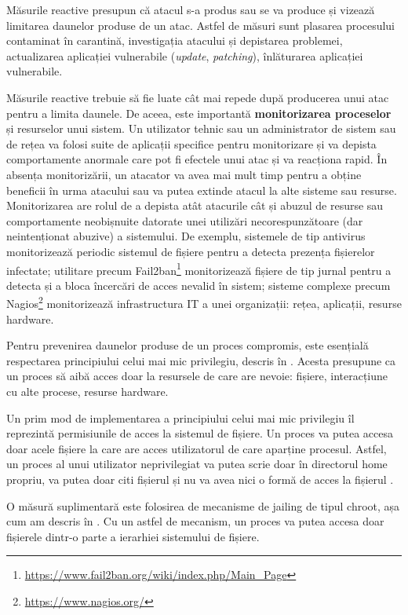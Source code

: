 Măsurile reactive presupun că atacul s-a produs sau se va produce și vizează limitarea daunelor produse de un atac. Astfel de măsuri sunt plasarea procesului contaminat în carantină, investigația atacului și depistarea problemei, actualizarea aplicației vulnerabile (\textit{update}, \textit{patching}), înlăturarea aplicației vulnerabile.

Măsurile reactive trebuie să fie luate cât mai repede după producerea unui atac pentru a limita daunele. De aceea, este importantă \textbf{monitorizarea proceselor} și resurselor unui sistem. Un utilizator tehnic sau un administrator de sistem sau de rețea va folosi suite de aplicații specifice pentru monitorizare și va depista comportamente anormale care pot fi efectele unui atac și va reacționa rapid. În absența monitorizării, un atacator va avea mai mult timp pentru a obține beneficii în urma atacului sau va putea extinde atacul la alte sisteme sau resurse. Monitorizarea are rolul de a depista atât atacurile cât și abuzul de resurse sau comportamente neobișnuite datorate unei utilizări necorespunzătoare (dar neintenționat abuzive) a sistemului. De exemplu, sistemele de tip antivirus monitorizează periodic sistemul de fișiere pentru a detecta prezența fișierelor infectate; utilitare precum Fail2ban\footnote{\url{https://www.fail2ban.org/wiki/index.php/Main\_Page}} monitorizează fișiere de tip jurnal pentru a detecta și a bloca încercări de acces nevalid în sistem; sisteme complexe precum Nagios\footnote{\url{https://www.nagios.org/}} monitorizează infrastructura IT a unei organizații: rețea, aplicații, resurse hardware.

Pentru prevenirea daunelor produse de un proces compromis, este esențială respectarea principiului celui mai mic privilegiu, descris în . Acesta presupune ca un proces să aibă acces doar la resursele de care are nevoie: fișiere, interacțiune cu alte procese, resurse hardware.

Un prim mod de implementarea a principiului celui mai mic privilegiu îl reprezintă permisiunile de acces la sistemul de fișiere. Un proces va putea accesa doar acele fișiere la care are acces utilizatorul de care aparține procesul. Astfel, un proces al unui utilizator neprivilegiat va putea scrie doar în directorul home propriu, va putea doar citi fișierul  și nu va avea nici o formă de acces la fișierul .

O măsură suplimentară este folosirea de mecanisme de jailing de tipul chroot, așa cum am descris în . Cu un astfel de mecanism, un proces va putea accesa doar fișierele dintr-o parte a ierarhiei sistemului de fișiere.

